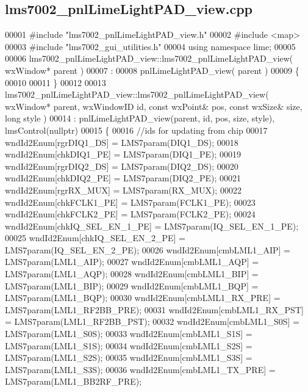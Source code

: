 \subsection{lms7002\+\_\+pnl\+Lime\+Light\+P\+A\+D\+\_\+view.\+cpp}
\label{lms7002__pnlLimeLightPAD__view_8cpp_source}

\begin{DoxyCode}
00001 \textcolor{preprocessor}{#include "lms7002_pnlLimeLightPAD_view.h"}
00002 \textcolor{preprocessor}{#include <map>}
00003 \textcolor{preprocessor}{#include "lms7002_gui_utilities.h"}
00004 \textcolor{keyword}{using namespace }lime;
00005 
00006 lms7002_pnlLimeLightPAD_view::lms7002_pnlLimeLightPAD_view( wxWindow* parent )
00007 :
00008 pnlLimeLightPAD_view( parent )
00009 \{
00010 
00011 \}
00012 
00013 lms7002_pnlLimeLightPAD_view::lms7002_pnlLimeLightPAD_view( wxWindow* parent, wxWindowID \textcolor{keywordtype}{id}, \textcolor{keyword}{const} wxPoint&
       pos, \textcolor{keyword}{const} wxSize& size, \textcolor{keywordtype}{long} style )
00014     : pnlLimeLightPAD_view(parent, id, pos, size, style), lmsControl(nullptr)
00015 \{
00016     \textcolor{comment}{//ids for updating from chip}
00017     wndId2Enum[rgrDIQ1_DS] = LMS7param(DIQ1_DS);
00018     wndId2Enum[chkDIQ1_PE] = LMS7param(DIQ1_PE);
00019     wndId2Enum[rgrDIQ2_DS] = LMS7param(DIQ2_DS);
00020     wndId2Enum[chkDIQ2_PE] = LMS7param(DIQ2_PE);
00021     wndId2Enum[rgrRX_MUX] = LMS7param(RX_MUX);
00022     wndId2Enum[chkFCLK1_PE] = LMS7param(FCLK1_PE);
00023     wndId2Enum[chkFCLK2_PE] = LMS7param(FCLK2_PE);
00024     wndId2Enum[chkIQ_SEL_EN_1_PE] = LMS7param(IQ_SEL_EN_1_PE);
00025     wndId2Enum[chkIQ_SEL_EN_2_PE] = LMS7param(IQ_SEL_EN_2_PE);
00026     wndId2Enum[cmbLML1_AIP] = LMS7param(LML1_AIP);
00027     wndId2Enum[cmbLML1_AQP] = LMS7param(LML1_AQP);
00028     wndId2Enum[cmbLML1_BIP] = LMS7param(LML1_BIP);
00029     wndId2Enum[cmbLML1_BQP] = LMS7param(LML1_BQP);
00030     wndId2Enum[cmbLML1_RX_PRE] = LMS7param(LML1_RF2BB_PRE);
00031     wndId2Enum[cmbLML1_RX_PST] = LMS7param(LML1_RF2BB_PST);
00032     wndId2Enum[cmbLML1_S0S] = LMS7param(LML1_S0S);
00033     wndId2Enum[cmbLML1_S1S] = LMS7param(LML1_S1S);
00034     wndId2Enum[cmbLML1_S2S] = LMS7param(LML1_S2S);
00035     wndId2Enum[cmbLML1_S3S] = LMS7param(LML1_S3S);
00036     wndId2Enum[cmbLML1_TX_PRE] = LMS7param(LML1_BB2RF_PRE);

\end{DoxyCode}
